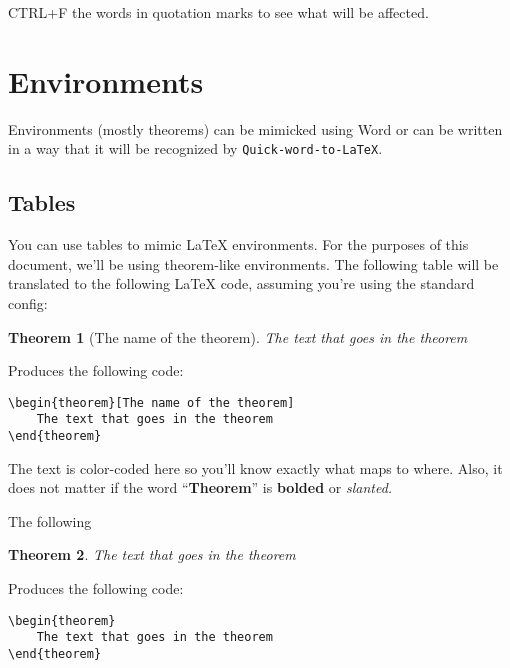 \documentclass[12pt]{article}
\theoremstyle{plain}
\newtheorem{theorem}{Theorem}[section]
\theoremstyle{remark}
\theoremstyle{definition}
\begin{document}
CTRL+F the words in quotation marks to see what will be affected.


\section{Environments}

Environments (mostly theorems) can be mimicked using Word or can be
written in a way that it will be recognized by
\texttt{Quick-word-to-LaTeX}.


\subsection{Tables}

You can use tables to mimic LaTeX environments. For the purposes of this
document, we'll be using theorem-like environments. The following table
will be translated to the following LaTeX code, assuming you're using
the standard config:

\begin{theorem}[The name of the theorem]

The text that goes in the theorem
\end{theorem}

Produces the following code:

\begin{verbatim}
\begin{theorem}[The name of the theorem]
    The text that goes in the theorem
\end{theorem}
\end{verbatim}

The text is color-coded here so you'll know exactly what maps to where.
Also, it does not matter if the word ``\textbf{Theorem}'' is
\textbf{bolded} or \emph{slanted.}

The following

\begin{theorem}

The text that goes in the theorem
\end{theorem}

Produces the following code:

\begin{verbatim}
\begin{theorem}
    The text that goes in the theorem
\end{theorem}
\end{verbatim}
\end{document}
